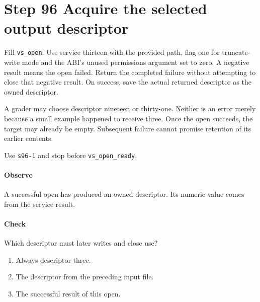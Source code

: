 \section{Step 96 Acquire the selected output descriptor}
Fill \texttt{vs\_open}. Use service thirteen with the provided path, flag one for truncate-write mode and the ABI's unused permissions argument set to zero. A negative result means the open failed. Return the completed failure without attempting to close that negative result. On success, save the actual returned descriptor as the owned descriptor.

A grader may choose descriptor nineteen or thirty-one. Neither is an error merely because a small example happened to receive three. Once the open succeeds, the target may already be empty. Subsequent failure cannot promise retention of its earlier contents.

Use \texttt{s96-1} and stop before \texttt{vs\_open\_ready}.

\paragraph{Observe} A successful open has produced an owned descriptor. Its numeric value comes from the service result.

\paragraph{Check} Which descriptor must later writes and close use?
\begin{enumerate}[label=\Alph*.]
\item Always descriptor three.
\item The descriptor from the preceding input file.
\item The successful result of this open.
\end{enumerate}
